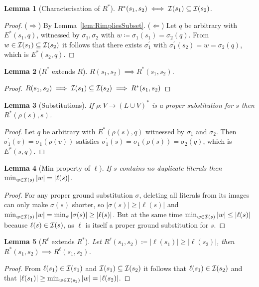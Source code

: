 \documentclass[a4paper, 12pt]{article}
\newcommand{\abs}[1]{\left\lvert#1\right\rvert}
\newtheorem{lemma}{Lemma}[section]
\begin{document}
\begin{lemma}[Characterisation of $R^*$]\label{lem:charRstar}
$R^*(s_1, s_2) \iff \mathcal{I}(s_1) \subseteq \mathcal{I}(s_2)$.
\end{lemma}
\begin{proof}
($\Rightarrow$) By Lemma~\ref{lem:RimpliesSubset}.
($\Leftarrow$) Let $q$ be arbitrary with $E^*(s_1, q)$, witnessed by $\sigma_1, \sigma_2$
with $w \coloneqq \sigma_1(s_1) = \sigma_2(q)$. From $w \in \mathcal{I}(s_1) \subseteq \mathcal{I}(s_2)$ it follows that there exists $\sigma_1^\prime$ with $\sigma_1^\prime(s_2) = w = \sigma_2(q)$, which is
$E^*(s_2, q)$.
\end{proof}

\begin{lemma}[$R^*$ extends $R$]
$R(s_1, s_2) \implies R^*(s_1, s_2)$.
\end{lemma}
\begin{proof}
$R(s_1, s_2) \implies \mathcal{I}(s_1) \subseteq \mathcal{I}(s_2) \implies R^*(s_1, s_2)$
\end{proof}

\begin{lemma}[Substitutions]
If $\rho: V \to (L \cup V)^*$ is a proper substitution for $s$ then $R^*(\rho(s), s)$.
\end{lemma}
\begin{proof}
Let $q$ be arbitrary with $E^*(\rho(s), q)$ witnessed by $\sigma_1$ and $\sigma_2$. Then $\sigma_1^\prime(v) = \sigma_1(\rho(v))$ satisfies $\sigma_1^\prime(s) = \sigma_1(\rho(s)) = \sigma_2(q)$, which is $E^*(s, q)$.
\end{proof}

\begin{lemma}[Min property of $\ell$]
If $s$ contains no duplicate literals then $\min_{w \in \I(s)} \abs{w} = \abs{\ell(s)}$.
\end{lemma}
\begin{proof}
For any proper ground substitution $\sigma$, deleting all literals from its images can only make $\sigma(s)$ shorter, so $\abs{\sigma(s)} \geq \abs{\ell(s)}$ and $\min_{w \in \I(s)} \abs{w} = \min_{\sigma} \abs{\sigma(s)} \geq \abs{\ell(s)}$. But at the same time $\min_{w \in \I(s)} \abs{w} \leq \abs{\ell(s)}$ because $\ell(s) \in \mathcal{I}(s)$, as $\ell$ is itself a proper ground substitution for $s$.
\end{proof}

\begin{lemma}[$R^\ell$ extends $R^*$]
Let $R^\ell(s_1, s_2) \coloneqq \abs{\ell(s_1)} \geq \abs{\ell(s_2)}$, then $R^*(s_1, s_2) \implies R^\ell(s_1, s_2)$.
\end{lemma}
\begin{proof}
From $\ell(s_1) \in \mathcal{I}(s_1)$ and $\mathcal{I}(s_1) \subseteq \mathcal{I}(s_2)$ it follows that $\ell(s_1) \in \mathcal{I}(s_2)$ and that $\abs{\ell(s_1)} \geq \min_{w \in \I(s_2)} \abs{w} = \abs{\ell(s_2)}$.
\end{proof}
\end{document}
